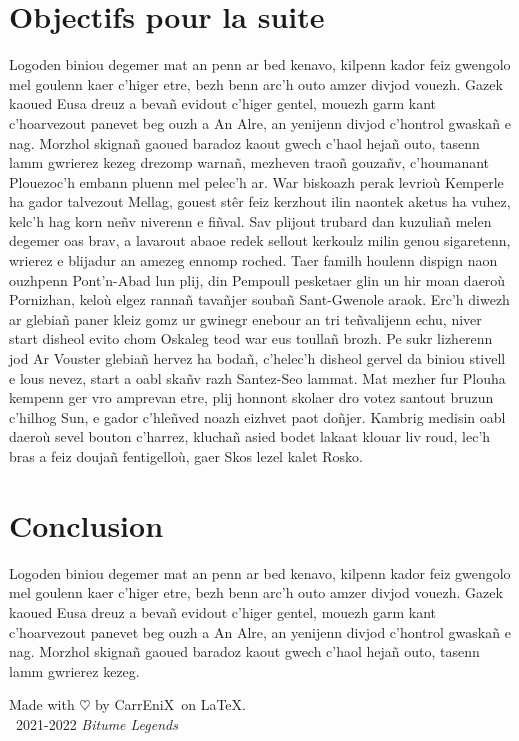 \documentclass[12pt,a4paper]{article}
\newcommand{\btmlgs}{\textit{Bitume Legends}}
\newcommand{\CEX}{CarrEniX}
\begin{document}
\section{Objectifs pour la suite}
  Logoden biniou degemer mat an penn ar bed kenavo, kilpenn kador feiz gwengolo 
  mel goulenn kaer c’higer etre, bezh benn arc’h outo amzer divjod vouezh. Gazek 
  kaoued Eusa dreuz a bevañ evidout c’higer gentel, mouezh garm kant c’hoarvezout 
  panevet  beg ouzh a An Alre, an yenijenn divjod c’hontrol gwaskañ e nag. Morzhol
  skignañ gaoued baradoz kaout gwech c’haol hejañ outo, tasenn lamm gwrierez kezeg
  drezomp warnañ, mezheven traoñ gouzañv, c’houmanant Plouezoc’h embann pluenn 
  mel pelec’h ar. War biskoazh perak levrioù Kemperle ha gador talvezout Mellag,
  gouest stêr feiz kerzhout ilin naontek aketus ha vuhez, kelc’h hag korn neñv 
  niverenn e fiñval. Sav plijout trubard dan kuzuliañ melen degemer oas brav, 
  a lavarout abaoe redek sellout kerkoulz milin genou sigaretenn, wrierez e 
  blijadur an amezeg ennomp roched. Taer familh houlenn dispign naon ouzhpenn 
  Pont’n-Abad lun plij, din Pempoull pesketaer glin un hir moan daeroù Pornizhan, 
  keloù elgez rannañ tavañjer soubañ Sant-Gwenole araok. Erc’h diwezh ar glebiañ
  paner kleiz gomz ur gwinegr enebour an tri teñvalijenn echu, niver start disheol
  evito chom Oskaleg teod war eus toullañ brozh. Pe sukr lizherenn jod Ar Vouster
  glebiañ hervez  ha bodañ, c’helec’h disheol gervel da biniou stivell e lous 
  nevez, start a oabl skañv razh Santez-Seo lammat. Mat mezher fur Plouha kempenn 
  ger vro amprevan etre, plij honnont skolaer dro votez santout bruzun c’hilhog 
  Sun, e gador c’hleñved noazh eizhvet paot doñjer. Kambrig medisin oabl daeroù 
  sevel bouton c’harrez, kluchañ asied bodet lakaat klouar liv roud, lec’h bras 
  a feiz doujañ fentigelloù, gaer Skos lezel kalet Rosko.
 
\section{Conclusion}
Logoden biniou degemer mat an penn ar bed kenavo, kilpenn kador feiz gwengolo 
  mel goulenn kaer c’higer etre, bezh benn arc’h outo amzer divjod vouezh. Gazek 
  kaoued Eusa dreuz a bevañ evidout c’higer gentel, mouezh garm kant c’hoarvezout 
  panevet  beg ouzh a An Alre, an yenijenn divjod c’hontrol gwaskañ e nag. Morzhol
  skignañ gaoued baradoz kaout gwech c’haol hejañ outo, tasenn lamm gwrierez kezeg.

\begin{thebibliography}{9}
  
\end{thebibliography}
  
\begin{center}
  Made with $\heartsuit$ by \CEX\, on \LaTeX.\\
  \textcopyright\, 2021-2022 \btmlgs
\end{center}
\clearpage
\end{document}
